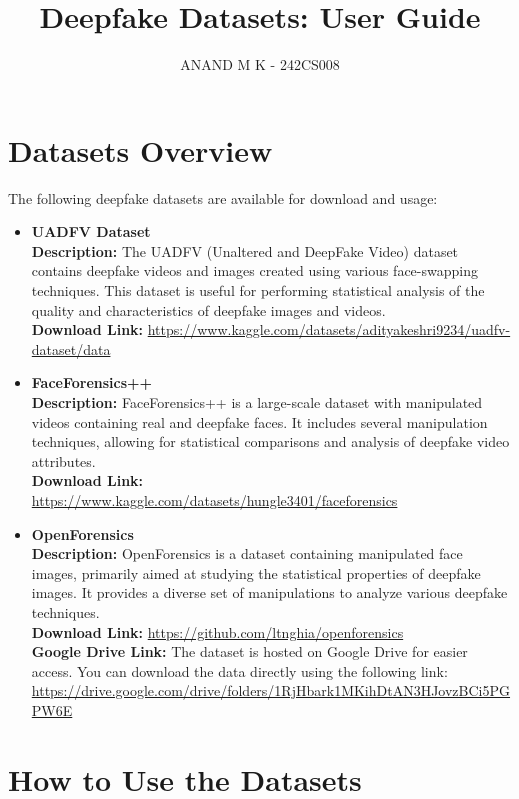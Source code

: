 \documentclass{article}
\title{Deepfake Datasets: User Guide}
\author{ANAND M K - 242CS008}
\date{}
\begin{document}
\maketitle


\section{Datasets Overview}

The following deepfake datasets are available for download and usage:

\begin{itemize}
    \item \textbf{UADFV Dataset} \\
    \textbf{Description:} The UADFV (Unaltered and DeepFake Video) dataset contains deepfake videos and images created using various face-swapping techniques. This dataset is useful for performing statistical analysis of the quality and characteristics of deepfake images and videos. \\
    \textbf{Download Link:} \url{https://www.kaggle.com/datasets/adityakeshri9234/uadfv-dataset/data}
    
    \item \textbf{FaceForensics++} \\
    \textbf{Description:} FaceForensics++ is a large-scale dataset with manipulated videos containing real and deepfake faces. It includes several manipulation techniques, allowing for statistical comparisons and analysis of deepfake video attributes. \\
    \textbf{Download Link:} \url{https://www.kaggle.com/datasets/hungle3401/faceforensics}

    \item \textbf{OpenForensics} \\
    \textbf{Description:} OpenForensics is a dataset containing manipulated face images, primarily aimed at studying the statistical properties of deepfake images. It provides a diverse set of manipulations to analyze various deepfake techniques. \\
    \textbf{Download Link:} \url{https://github.com/ltnghia/openforensics} \\
    \textbf{Google Drive Link:} The dataset is hosted on Google Drive for easier access. You can download the data directly using the following link: \url{https://drive.google.com/drive/folders/1RjHbark1MKihDtAN3HJovzBCi5PGPW6E}
\end{itemize}

\section{How to Use the Datasets}
\end{document}
